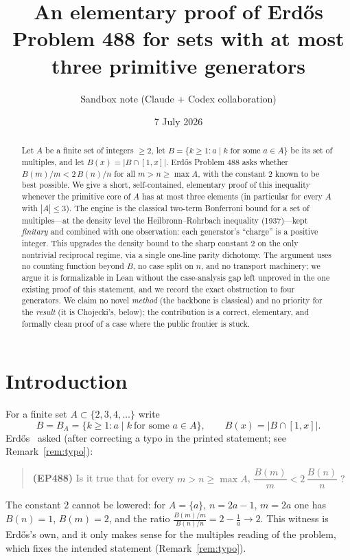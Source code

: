 \documentclass[11pt]{article}
\title{An elementary proof of Erd\H{o}s Problem 488 for sets with at most three
primitive generators}
\author{Sandbox note (Claude + Codex collaboration)}
\date{7 July 2026}
\theoremstyle{remark}
\begin{document}
\maketitle

\begin{abstract}
Let $A$ be a finite set of integers $\ge 2$, let $B=\{k\ge 1: a\mid k \text{ for
some } a\in A\}$ be its set of multiples, and let $B(x)=|B\cap[1,x]|$.
Erd\H{o}s Problem 488 asks whether $B(m)/m < 2\,B(n)/n$ for all $m>n\ge\max A$,
with the constant $2$ known to be best possible. We give a short, self-contained,
elementary proof of this inequality whenever the primitive core of $A$ has at most
three elements (in particular for every $A$ with $|A|\le 3$). The engine is the
classical two-term Bonferroni bound for a set of multiples---at the density level
the Heilbronn--Rohrbach inequality (1937)---kept \emph{finitary} and combined with
one observation: each generator's ``charge'' is a positive integer. This upgrades
the density bound to the sharp constant $2$ on the only nontrivial reciprocal
regime, via a single one-line parity dichotomy. The argument uses no counting
function beyond $B$, no case split on $n$, and no transport machinery; we argue it
is formalizable in Lean without the case-analysis gap left unproved in the one
existing proof of this statement, and we record the exact obstruction to four
generators. We claim no novel \emph{method} (the backbone is classical) and no
priority for the \emph{result} (it is Chojecki's, below); the contribution is a
correct, elementary, and formally clean proof of a case where the public frontier
is stuck.
\end{abstract}

\section{Introduction}

For a finite set $A\subset\{2,3,4,\dots\}$ write
\[
  B=B_A=\{k\ge 1: a\mid k\ \text{for some }a\in A\}, \qquad B(x)=|B\cap[1,x]|.
\]
Erd\H{o}s~\cite[Problem~27, p.~236]{Erdos61} asked (after correcting a typo in the
printed statement; see Remark~\ref{rem:typo}):

\begin{quote}
\textbf{(EP488)} Is it true that for every $m>n\ge\max A$,
\(
   \dfrac{B(m)}{m} < 2\,\dfrac{B(n)}{n}\;?
\)
\end{quote}

The constant $2$ cannot be lowered: for $A=\{a\}$, $n=2a-1$, $m=2a$ one has
$B(n)=1$, $B(m)=2$, and the ratio $\tfrac{B(m)/m}{B(n)/n}=2-\tfrac1a\to 2$. This
witness is Erd\H{o}s's own, and it only makes sense for the multiples reading of
the problem, which fixes the intended statement (Remark~\ref{rem:typo}).
\end{document}
